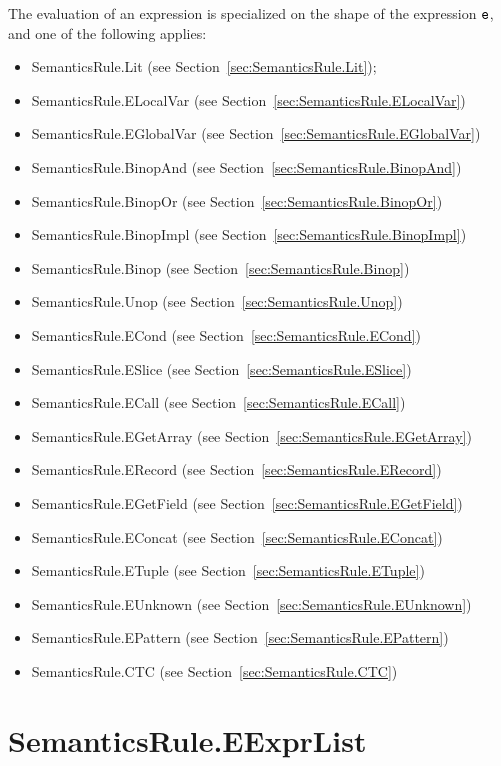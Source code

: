 \documentclass{book}
\begin{document}
The evaluation of an expression is specialized on the shape of the expression $\texttt{e}$,
and one of the following applies:
\begin{itemize}
\item SemanticsRule.Lit (see Section~\ref{sec:SemanticsRule.Lit});
\item SemanticsRule.ELocalVar (see Section~\ref{sec:SemanticsRule.ELocalVar})
\item SemanticsRule.EGlobalVar (see Section~\ref{sec:SemanticsRule.EGlobalVar})
\item SemanticsRule.BinopAnd (see Section~\ref{sec:SemanticsRule.BinopAnd})
\item SemanticsRule.BinopOr (see Section~\ref{sec:SemanticsRule.BinopOr})
\item SemanticsRule.BinopImpl (see Section~\ref{sec:SemanticsRule.BinopImpl})
\item SemanticsRule.Binop (see Section~\ref{sec:SemanticsRule.Binop})
\item SemanticsRule.Unop (see Section~\ref{sec:SemanticsRule.Unop})
\item SemanticsRule.ECond (see Section~\ref{sec:SemanticsRule.ECond})
\item SemanticsRule.ESlice (see Section~\ref{sec:SemanticsRule.ESlice})
\item SemanticsRule.ECall (see Section~\ref{sec:SemanticsRule.ECall})
\item SemanticsRule.EGetArray (see Section~\ref{sec:SemanticsRule.EGetArray})
\item SemanticsRule.ERecord (see Section~\ref{sec:SemanticsRule.ERecord})
\item SemanticsRule.EGetField (see Section~\ref{sec:SemanticsRule.EGetField})
\item SemanticsRule.EConcat (see Section~\ref{sec:SemanticsRule.EConcat})
\item SemanticsRule.ETuple (see Section~\ref{sec:SemanticsRule.ETuple})
\item SemanticsRule.EUnknown (see Section~\ref{sec:SemanticsRule.EUnknown})
\item SemanticsRule.EPattern (see Section~\ref{sec:SemanticsRule.EPattern})
\item SemanticsRule.CTC (see Section~\ref{sec:SemanticsRule.CTC})
\end{itemize}

\section{SemanticsRule.EExprList \label{sec:SemanticsRule.EExprList}}
\end{document}
